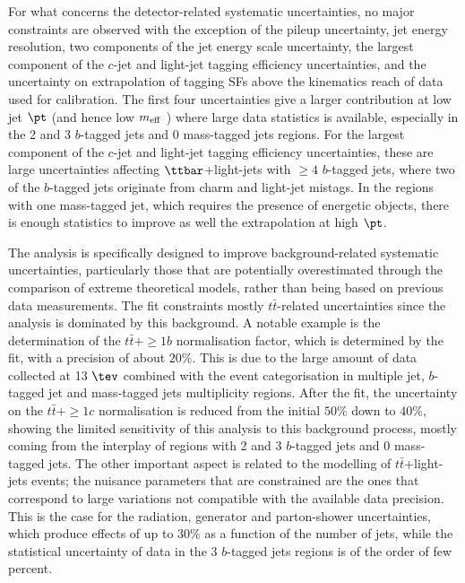 For what concerns the detector-related systematic uncertainties, no major constraints are observed with the exception of the pileup uncertainty, jet energy resolution, two components of the jet energy scale uncertainty, the largest component of the $c$-jet and light-jet tagging efficiency uncertainties, and the uncertainty on extrapolation of tagging SFs above the kinematics reach of data used for calibration. The first four uncertainties give a larger contribution at low jet $\pt$ (and hence low $m_{\rm eff}$ ) where large data statistics is available, especially in the 2 and 3 $b$-tagged jets and 0 mass-tagged jets regions. For the largest component of the $c$-jet and light-jet tagging efficiency uncertainties, these are large uncertainties affecting $\ttbar$+light-jets with $\ge4$ $b$-tagged jets, where two of the $b$-tagged jets originate from charm and light-jet mistags.
In the regions with one mass-tagged jet, which requires the presence of energetic objects, there is enough statistics to improve as well the extrapolation at high $\pt$.\par
The analysis is specifically designed to improve background-related systematic uncertainties, particularly those that are potentially overestimated through the comparison of extreme theoretical models, rather than being based on previous data measurements. The fit constraints mostly $t\bar{t}$-related uncertainties since the analysis is dominated by this background. A notable example is the determination of the $t\bar{t}+\ge1b$ normalisation factor, which is determined by the fit, with a precision of about $20\%$. This is due to the large amount of data collected at 13 $\tev$ combined with the event categorisation in multiple jet, $b$-tagged jet and mass-tagged jets multiplicity regions.
After the fit, the uncertainty on the $t\bar{t}+\ge1c$ normalisation is reduced from the initial $50\%$ down to $40\%$, showing the limited sensitivity of this analysis to this background process, mostly coming from the interplay of  regions with 2 and 3 $b$-tagged jets and 0 mass-tagged jets.
The other important aspect is related to the modelling of $t\bar{t}$+light-jets events; the nuisance parameters that are constrained are the ones that correspond to large variations not compatible with the available data precision. This is the case for the radiation, generator and parton-shower uncertainties, which produce effects of up to $30\%$ as a function of the number of jets, while the statistical uncertainty of data in the 3 $b$-tagged jets regions is of the order of few percent.

